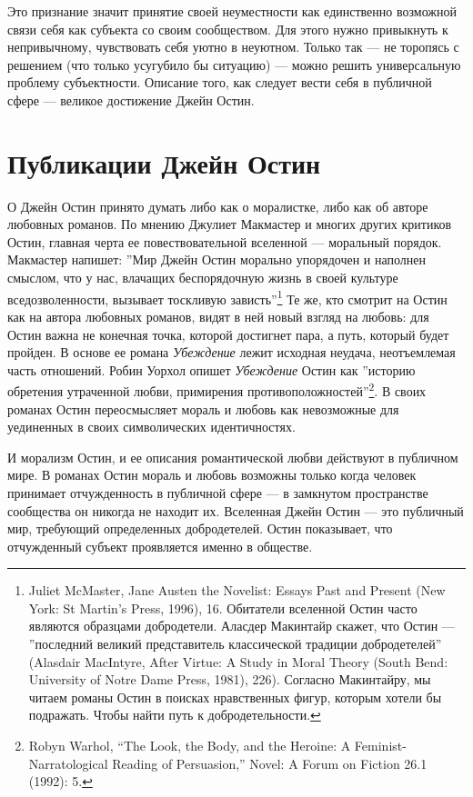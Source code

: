 \documentclass[12pt]{book}
\begin{document}
Это признание значит принятие своей неуместности как единственно возможной связи себя как субъекта со своим сообществом. Для этого нужно привыкнуть к непривычному, чувствовать себя уютно в неуютном. Только так --- не торопясь с решением (что только усугубило бы ситуацию) --- можно решить универсальную проблему субъектности. Описание того, как следует вести себя в публичной сфере --- великое достижение Джейн Остин.

\section{Публикации Джейн Остин}

О Джейн Остин принято думать либо как о моралистке, либо как об авторе любовных романов. По мнению Джулиет Макмастер и многих других критиков Остин, главная черта ее повествовательной вселенной --- моральный порядок. Макмастер напишет: ''Мир Джейн Остин морально упорядочен и наполнен смыслом, что у нас, влачащих беспорядочную жизнь в своей культуре вседозволенности, вызывает тоскливую зависть''\footnote{Juliet McMaster, Jane Austen the Novelist: Essays Past and Present (New York: St Martin’s Press, 1996), 16. Обитатели вселенной Остин часто являются образцами добродетели. Аласдер Макинтайр скажет, что Остин --- ''последний великий представитель классической традиции добродетелей'' (Alasdair MacIntyre, After Virtue: A Study in Moral Theory (South Bend: University of Notre Dame Press, 1981), 226). Согласно Макинтайру, мы читаем романы Остин в поисках нравственных фигур, которым хотели бы подражать. Чтобы найти путь к добродетельности.} Те же, кто смотрит на Остин как на автора любовных романов, видят в ней новый взгляд на любовь: для Остин важна не конечная точка, которой достигнет пара, а путь, который будет пройден. В основе ее романа \textit{Убеждение} лежит исходная неудача, неотъемлемая часть отношений. Робин Уорхол опишет \textit{Убеждение} Остин как ''историю обретения утраченной любви, примирения противоположностей''\footnote{Robyn Warhol, “The Look, the Body, and the Heroine: A Feminist-Narratological Reading of Persuasion,” Novel: A Forum on Fiction 26.1 (1992): 5.}. В своих романах Остин переосмысляет мораль и любовь как невозможные для уединенных в своих символических идентичностях.

И морализм Остин, и ее описания романтической любви действуют в публичном мире. В романах Остин мораль и любовь возможны только когда человек принимает отчужденность в публичной сфере --- в замкнутом пространстве сообщества он никогда не находит их. Вселенная Джейн Остин --- это публичный мир, требующий определенных добродетелей. Остин показывает, что отчужденный субъект проявляется именно в обществе.
\end{document}
